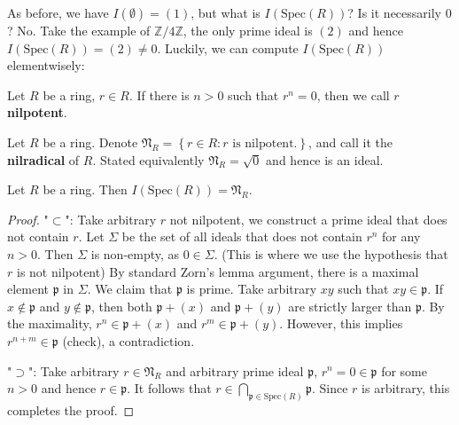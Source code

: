 \documentclass{note-eng}
\begin{document}
As before, we have $I(\emptyset) = (1)$, but what is $I(\mathrm{Spec}(R))$? Is it necessarily $0$? No. Take the example of $\mathbb{Z} / 4 \mathbb{Z}$, the only prime ideal is $(2)$ and hence $I(\mathrm{Spec}(R)) = (2) \ne 0$. Luckily, we can compute $I(\mathrm{Spec}(R))$ elementwisely:

\begin{definition}
    Let $R$ be a ring, $r \in R$. If there is $n \gt 0$ such that $r^n = 0$, then we call $r$ \textbf{nilpotent}. 
\end{definition}

\begin{definition}
    Let $R$ be a ring. Denote $\mathfrak{N}_R = \left\lbrace r \in R: r \text{ is nilpotent.} \right\rbrace$, and call it the \textbf{nilradical} of $R$. Stated equivalently $\mathfrak{N}_R = \sqrt{0}$ and hence is an ideal.
\end{definition}

\begin{proposition}\label{prop:prime-intersection}
    Let $R$ be a ring. Then $I(\mathrm{Spec}(R)) = \mathfrak{N}_R$.
\end{proposition}

\begin{proof}
    "$\subset$": Take arbitrary $r$ not nilpotent, we construct a prime ideal that does not contain $r$. Let $\Sigma$ be the set of all ideals that does not contain $r^n$ for any $n \gt 0$. Then $\Sigma$ is non-empty, as $0 \in \Sigma$. (This is where we use the hypothesis that $r$ is not nilpotent) By standard Zorn's lemma argument, there is a maximal element $\mathfrak{p}$ in $\Sigma$. We claim that $\mathfrak{p}$ is prime. Take arbitrary $xy$ such that $xy \in \mathfrak{p}$. If $x \notin \mathfrak{p}$ and $y \notin \mathfrak{p}$, then both $\mathfrak{p} + (x)$ and $\mathfrak{p} + (y)$ are strictly larger than $\mathfrak{p}$. By the maximality, $r^n \in \mathfrak{p} + (x)$ and $r^m \in \mathfrak{p} + (y)$. However, this implies $r^{n + m} \in \mathfrak{p}$ (check), a contradiction.

    "$\supset$": Take arbitrary $r \in \mathfrak{N}_R$ and arbitrary prime ideal $\mathfrak{p}$, $r^n = 0 \in \mathfrak{p}$ for some $n \gt 0$ and hence $r \in \mathfrak{p}$. It follows that $r \in \bigcap\limits_{\mathfrak{p} \in \mathrm{Spec}(R)} \mathfrak{p}$. Since $r$ is arbitrary, this completes the proof.
\end{proof}
\end{document}
